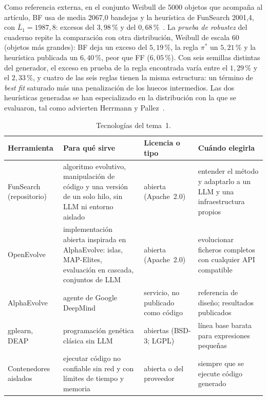 Como referencia externa, en el conjunto Weibull de 5000 objetos que acompaña al artículo, BF usa de media 2067{,}0 bandejas y la heurística de FunSearch 2001{,}4, con $\bar L_1=1987{,}8$: excesos del $3{,}98\,\%$ y del $0{,}68\,\%$~\cite{funsearch-code}. La \emph{prueba de robustez} del cuaderno repite la comparación con otra distribución, Weibull de escala 60 (objetos más grandes): BF deja un exceso del $5{,}19\,\%$, la regla $\pi^{*}$ un $5{,}21\,\%$ y la heurística publicada un $6{,}40\,\%$, peor que FF ($6{,}05\,\%$). Con seis semillas distintas del generador, el exceso en prueba de la regla encontrada varía entre el $1{,}29\,\%$ y el $2{,}33\,\%$, y cuatro de las seis reglas tienen la misma estructura: un término de \emph{best fit} saturado más una penalización de los huecos intermedios. Las dos heurísticas generadas se han especializado en la distribución con la que se evaluaron, tal como advierten Herrmann y Pallez~\cite{hp}.

\begin{table}[h]
\centering\small
\caption{Tecnologías del tema~1.}\label{tab:tec1}
\begin{tabularx}{\textwidth}{@{}>{\raggedright\arraybackslash}p{2.5cm}>{\raggedright\arraybackslash}X>{\raggedright\arraybackslash}p{2.1cm}>{\raggedright\arraybackslash}X@{}}
\toprule
Herramienta & Para qué sirve & Licencia o tipo & Cuándo elegirla \\
\midrule
FunSearch (repositorio)~\cite{funsearch-code} & algoritmo evolutivo, manipulación de código y una versión de un solo hilo, sin LLM ni entorno aislado & abierta (Apache~2.0) & entender el método y adaptarlo a un LLM y una infraestructura propios \\
OpenEvolve~\cite{openevolve} & implementación abierta inspirada en AlphaEvolve: islas, MAP-Elites, evaluación en cascada, conjuntos de LLM & abierta (Apache~2.0) & evolucionar ficheros completos con cualquier API compatible \\
AlphaEvolve~\cite{alphaevolve} & agente de Google DeepMind & servicio, no publicado como código & referencia de diseño; resultados publicados \\
gplearn, DEAP & programación genética clásica sin LLM & abiertas (BSD-3; LGPL) & línea base barata para expresiones pequeñas \\
Contenedores aislados & ejecutar código no confiable sin red y con límites de tiempo y memoria & abierta o del proveedor & siempre que se ejecute código generado \\
\bottomrule
\end{tabularx}
\end{table}

